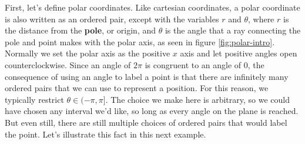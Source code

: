 First, let's define polar coordinates. Like cartesian coordinates, a polar coordinate is also written as an ordered pair, except with the variables $r$ and $\theta$, where $r$ is the distance from the \textbf{pole}, or origin, and $\theta$ is the angle that a ray connecting the pole and point makes with the polar axis, as seen in figure \eqref{fig:polar-intro}.
Normally we set the polar axis as the positive $x$ axis and let positive angles open counterclockwise.
Since an angle of $2\pi$ is congruent to an angle of $0$, the consequence of using an angle to label a point is that there are infinitely many ordered pairs that we can use to represent a position. 
For this reason, we typically restrict $\theta\in(-\pi,\pi]$. The choice we make here is arbitrary, so we could have chosen any interval we'd like, so long as every angle on the plane is reached.
But even still, there are still multiple choices of ordered pairs that would label the point.
Let's illustrate this fact in this next example.

